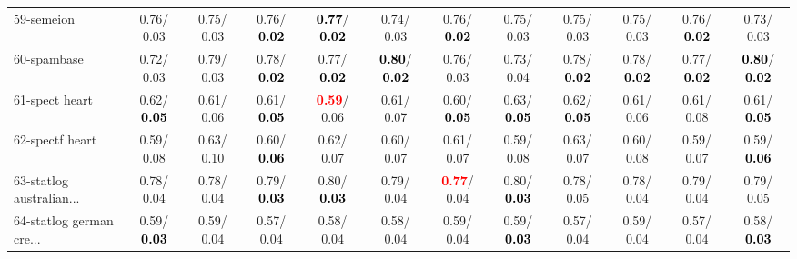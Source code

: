 \begin{table}[h]
\begin{center}
{\begin{tabular}{lc|c|c|c|c|c|c|c|c|c|c}
59-semeion &   0.76/  0.03 &   0.75/  0.03 &   0.76/\textcolor{black}{\textbf{  0.02}} & \textcolor{black}{\textbf{  0.77}}/\textcolor{black}{\textbf{  0.02}} &   0.74/  0.03 &   0.76/\textcolor{black}{\textbf{  0.02}} &   0.75/  0.03 &   0.75/  0.03 &   0.75/  0.03 &   0.76/\textcolor{black}{\textbf{  0.02}} &   0.73/  0.03 \\
60-spambase &   0.72/  0.03 &   0.79/  0.03 &   0.78/\textcolor{black}{\textbf{  0.02}} &   0.77/\textcolor{black}{\textbf{  0.02}} & \textcolor{black}{\textbf{  0.80}}/\textcolor{black}{\textbf{  0.02}} &   0.76/  0.03 &   0.73/  0.04 &   0.78/\textcolor{black}{\textbf{  0.02}} &   0.78/\textcolor{black}{\textbf{  0.02}} &   0.77/\textcolor{black}{\textbf{  0.02}} & \textcolor{black}{\textbf{  0.80}}/\textcolor{black}{\textbf{  0.02}} \\ \hline
61-spect heart &   0.62/\textcolor{black}{\textbf{  0.05}} &   0.61/  0.06 &   0.61/\textcolor{black}{\textbf{  0.05}} & \textcolor{red}{\textbf{  0.59}}/  0.06 &   0.61/  0.07 &   0.60/\textcolor{black}{\textbf{  0.05}} &   0.63/\textcolor{black}{\textbf{  0.05}} &   0.62/\textcolor{black}{\textbf{  0.05}} &   0.61/  0.06 &   0.61/  0.08 &   0.61/\textcolor{black}{\textbf{  0.05}} \\
62-spectf heart &   0.59/  0.08 &   0.63/  0.10 &   0.60/\textcolor{black}{\textbf{  0.06}} &   0.62/  0.07 &   0.60/  0.07 &   0.61/  0.07 &   0.59/  0.08 &   0.63/  0.07 &   0.60/  0.08 &   0.59/  0.07 &   0.59/\textcolor{black}{\textbf{  0.06}} \\
63-statlog australian... &   0.78/  0.04 &   0.78/  0.04 &   0.79/\textcolor{black}{\textbf{  0.03}} &   0.80/\textcolor{black}{\textbf{  0.03}} &   0.79/  0.04 & \textcolor{red}{\textbf{  0.77}}/  0.04 &   0.80/\textcolor{black}{\textbf{  0.03}} &   0.78/  0.05 &   0.78/  0.04 &   0.79/  0.04 &   0.79/  0.05 \\
64-statlog german cre... &   0.59/\textcolor{black}{\textbf{  0.03}} &   0.59/  0.04 &   0.57/  0.04 &   0.58/  0.04 &   0.58/  0.04 &   0.59/  0.04 &   0.59/\textcolor{black}{\textbf{  0.03}} &   0.57/  0.04 &   0.59/  0.04 &   0.57/  0.04 &   0.58/\textcolor{black}{\textbf{  0.03}} \\\end{tabular}}\label{stratsBalAcc1b5NN}
\end{center}
\end{table}
